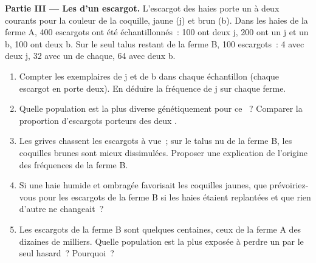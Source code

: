 \begin{problem}
\medskip
\noindent\textbf{Partie III --- Les  d'un escargot.}
L'escargot des haies porte un  à deux  courants pour la
couleur de la coquille, jaune (j) et brun (b). Dans les haies de la
ferme A, 400 escargots ont été échantillonnés~: 100 ont deux 
j, 200 ont un j et un b, 100 ont deux b. Sur le seul talus restant de
la ferme B, 100 escargots~: 4 avec deux j, 32 avec un de chaque, 64
avec deux b.
\begin{enumerate}[resume]
  \item Compter les exemplaires de j et de b dans chaque échantillon
        (chaque escargot en porte deux). En déduire la fréquence de j
        sur chaque ferme.
  \item Quelle population est la plus diverse génétiquement pour ce
        ~? Comparer la proportion d'escargots porteurs des deux
        .
  \item Les grives chassent les escargots à vue~; sur le talus nu de
        la ferme B, les coquilles brunes sont mieux dissimulées.
        Proposer une explication de l'origine des fréquences de la
        ferme B.
  \item Si une haie humide et ombragée favorisait les coquilles
        jaunes, que prévoiriez-vous pour les escargots de la ferme B
        si les haies étaient replantées et que rien d'autre ne
        changeait~?
  \item Les escargots de la ferme B sont quelques centaines, ceux de
        la ferme A des dizaines de milliers. Quelle population est la
        plus exposée à perdre un  par le seul hasard~? Pourquoi~?
\end{enumerate}


\end{problem}
